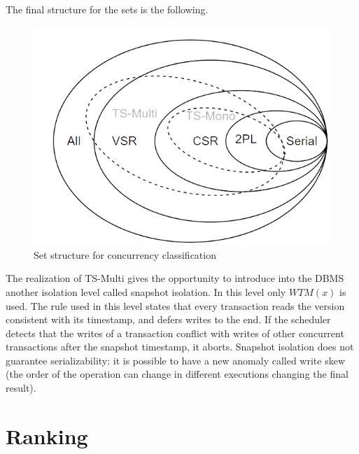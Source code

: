 \documentclass[12pt, a4paper]{report}
\newtheorem[style=M,bodystyle=\normalfont]{theorem}{Theorem}
\newtheorem[style=M,bodystyle=\normalfont]{corollary}{Corollary}
\newtheorem[style=M,bodystyle=\normalfont]{lemma}{Lemma}
\newtheorem[style=M,bodystyle=\normalfont]{definition}{Definition}
\begin{document}
    The final structure for the sets is the following. 
    \begin{figure}[H]
        \centering
        \includegraphics[width=0.75\linewidth]{images/set.png}
        \caption{Set structure for concurrency classification}
    \end{figure}
    The realization of TS-Multi gives the opportunity to introduce into the DBMS another isolation level called snapshot isolation. In this level only $WTM(x)$ is used. The rule 
    used in this level states that every transaction reads the version consistent with its timestamp, and defers writes to the end. If the scheduler detects that the writes of a
    transaction conflict with writes of other concurrent transactions after the snapshot timestamp, it aborts. Snapshot isolation does not guarantee serializability: it is possible 
    to have a new anomaly called write skew (the order of the operation can change in different executions changing the final result). 
    
    \newpage 

\chapter{Ranking}
\end{document}
